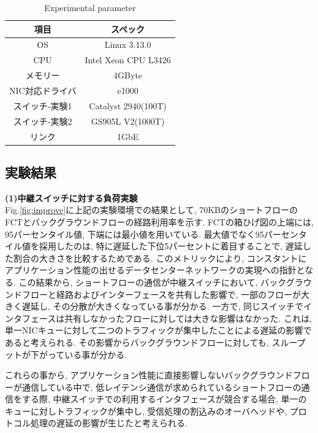 \begin{table}[t]
\begin{center}
\footnotesize
\begin{tabular}{c|c}
\hline
項目 & スペック \\ \hline \hline
OS & Linux 3.13.0 \\
CPU & Intel Xeon CPU L3426 \\
メモリー & 4GByte \\
NIC対応ドライバ & e1000 \\
スイッチ-実験1 & Catalyst 2940(100T) \\
スイッチ-実験2 & GS905L V2(1000T) \\
リンク & 1GbE \\
\hline
\end{tabular}
\caption{Experimental parameter}
\label{table:experiment_ver}
\end{center}
\end{table}

\subsection{実験結果}
{\bf (1)中継スイッチに対する負荷実験}\\
Fig.\ref{fig:improve}に上記の実験環境での結果として, 70KBのショートフローのFCTとバックグラウンドフローの経路利用率を示す.
FCTの箱ひげ図の上端には, 95パーセンタイル値, 下端には最小値を用いている.
最大値でなく95パーセンタイル値を採用したのは, 特に遅延した下位5パーセントに着目することで, 遅延した割合の大きさを比較するためである.
このメトリックにより, コンスタントにアプリケーション性能の出せるデータセンターネットワークの実現への指針となる.
この結果から, ショートフローの通信が中継スイッチにおいて, バックグラウンドフローと経路およびインターフェースを共有した影響で,
一部のフローが大きく遅延し, その分散が大きくなっている事が分かる.
一方で, 同じスイッチでインタフェースは共有しなかったフローに対しては大きな影響はなかった.
これは, 単一NICキューに対して二つのトラフィックが集中したことによる遅延の影響であると考えられる.
その影響からバックグラウンドフローに対しても, スループットが下がっている事が分かる.

これらの事から, アプリケーション性能に直接影響しないバックグラウンドフローが通信している中で,
低レイテンシ通信が求められているショートフローの通信をする際, 中継スイッチでの利用するインタフェースが競合する場合,
単一のキューに対しトラフィックが集中し, 受信処理の割込みのオーバヘッドや, プロトコル処理の遅延の影響が生じたと考えられる.

